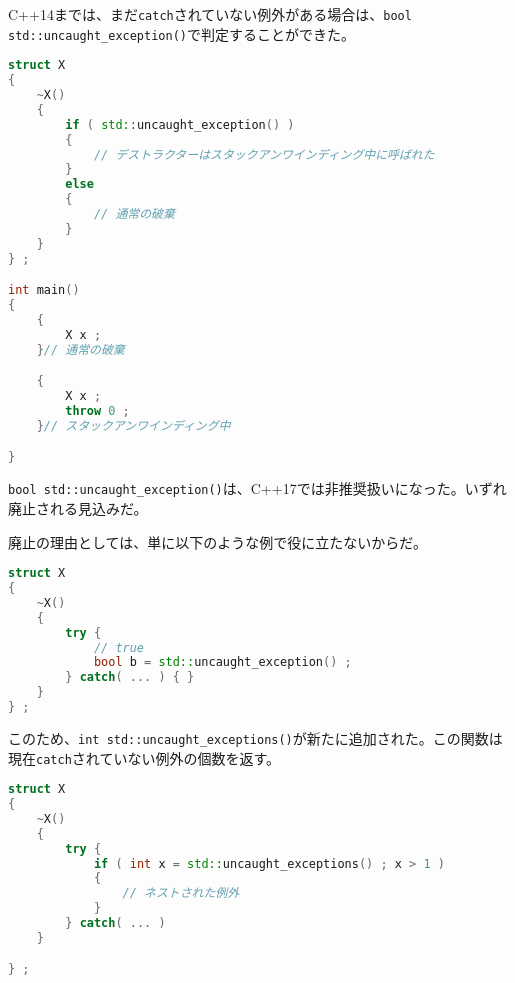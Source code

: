 %

C++14までは、まだ\lstinline!catch!されていない例外がある場合は、\lstinline[breaklines=true]!bool std::uncaught_exception()!で判定することができた。

\begin{lstlisting}[language=C++]
struct X
{
    ~X()
    {
        if ( std::uncaught_exception() )
        {
            // デストラクターはスタックアンワインディング中に呼ばれた
        }
        else
        {
            // 通常の破棄
        }
    }
} ;

int main()
{
    {
        X x ;
    }// 通常の破棄

    {
        X x ;
        throw 0 ;
    }// スタックアンワインディング中

}
\end{lstlisting}

\lstinline!bool std::uncaught_exception()!は、C++17では非推奨扱いになった。いずれ廃止される見込みだ。

廃止の理由としては、単に以下のような例で役に立たないからだ。

\begin{lstlisting}[language=C++]
struct X
{
    ~X()
    {
        try {
            // true
            bool b = std::uncaught_exception() ;
        } catch( ... ) { }
    }
} ;
\end{lstlisting}

このため、\lstinline!int std::uncaught_exceptions()!が新たに追加された。この関数は現在\lstinline!catch!されていない例外の個数を返す。

\begin{lstlisting}[language=C++]
struct X
{
    ~X()
    {
        try {
            if ( int x = std::uncaught_exceptions() ; x > 1 )
            {
                // ネストされた例外
            }
        } catch( ... )
    }

} ;
\end{lstlisting}

